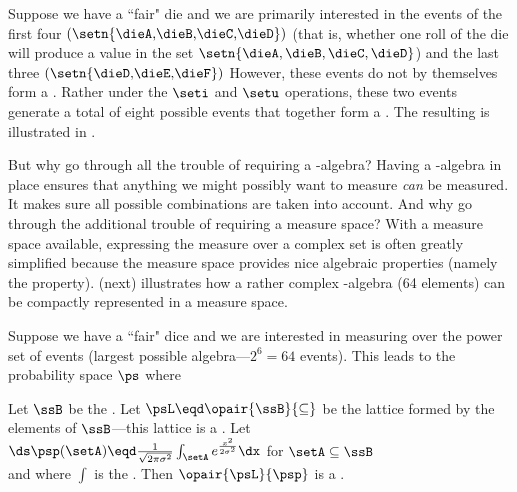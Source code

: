 \begin{example}
\label{ex:die_first4}
Suppose we have a ``fair" die and we are primarily interested in the
events of the first four
$\left(\setn{\text{\dieA,\dieB,\dieC,\dieD}}\right)$
(that is, whether one roll of the die will produce
a value in the set $\setn{\dieA,\dieB,\dieC,\dieD}$)
and the last three
$\left(\setn{\text{\dieD,\dieE,\dieF}}\right)$
However, these events do not by themselves form a .
Rather under the $\seti$ and $\setu$ operations, these two events generate
a total of eight possible events that together form a .
The resulting  is illustrated in .
\end{example}

But why go through all the trouble of requiring a \txsigma-algebra?
Having a \txsigma-algebra in place ensures that anything we might possibly 
want to measure {\em can} be measured.
It makes sure all possible combinations are taken into account.
And why go through the additional trouble of requiring a measure space?
With a measure space available, expressing the measure over a complex
set is often greatly simplified because the measure space provides nice 
algebraic properties (namely the  property).
 (next) illustrates how a rather complex
\txsigma-algebra (64 elements) can be compactly represented in a measure space.
\begin{example}
\label{ex:prob_123456}
Suppose we have a ``fair" dice and we are interested in measuring over the
power set of events (largest possible algebra---$2^6=64$ events).
This leads to the probability space $\ps$ where
\end{example}

\begin{example}
Let $\ssB$ be the .
Let $\psL\eqd\opair{\ssB}{\subseteq}$ be the lattice formed by the elements of $\ssB$---this
lattice is a .
Let 
\\\indentx$\ds\psp(\setA)\eqd\frac{1}{\sqrt{2\pi\sigma^2}}\int_\setA e^{\frac{x^2}{2\sigma^2}}\dx$ for $\setA\subseteq\ssB$\\
and where $\int$ is the  .
Then $\opair{\psL}{\psp}$ is a . 
\end{example}

